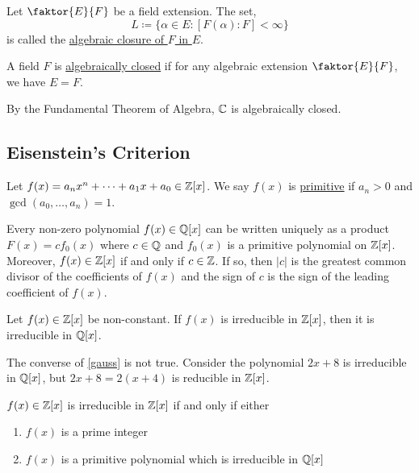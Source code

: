 \documentclass[11pt]{article}
\newcommand{\quotient}[2]{\faktor{#1}{#2}}
\begin{document}
\begin{definition}
Let $\quotient{E}{F}$ be a field extension. The set,
\begin{equation*}
L \coloneqq \{\alpha \in E: [F(\alpha) : F] < \infty\}
\end{equation*}
is called the \underline{algebraic closure of $F$ in $E$}.
\end{definition}
\begin{definition}
A field $F$ is \underline{algebraically closed} if for any algebraic extension
$\quotient{E}{F}$, we have $E = F$.
\end{definition}
\begin{example}
By the Fundamental Theorem of Algebra, $\mathbb{C}$ is algebraically closed.
\end{example}

\subsection{Eisenstein's Criterion}
\begin{definition}
Let $f(x) = a_nx^n + \dots + a_1x + a_0 \in \mathbb{Z}[x]$. We say $f(x)$ is
\underline{primitive} if $a_n > 0$ and $\gcd(a_0, \dots, a_n) = 1$. 
\end{definition}
\begin{lemma*}
Every non-zero polynomial $f(x) \in \mathbb{Q}[x]$ can be written uniquely as a product
$F(x) = cf_0(x)$ where $c \in \mathbb{Q}$ and $f_0(x)$ is a primitive polynomial on
$\mathbb{Z}[x]$. Moreover, $f(x) \in \mathbb{Z}[x]$ if and only if $c \in \mathbb{Z}$. If so, then
$|c|$ is the greatest common divisor of the coefficients of $f(x)$ and the sign
of $c$ is the sign of the leading coefficient of $f(x)$.
\end{lemma*}
\begin{theorem*} \label{gauss}
Let $f(x) \in \mathbb{Z}[x]$ be non-constant. If $f(x)$ is irreducible in $\mathbb{Z}[x]$, then
it is irreducible in $\mathbb{Q}[x]$. 
\end{theorem*}
\begin{example}
The converse of \cref{gauss} is not true. Consider the polynomial $2x + 8$ is
irreducible in $\mathbb{Q}[x]$, but $2x+8 = 2(x+4)$ is reducible in $\mathbb{Z}[x]$.
\end{example}
\begin{remark}
$f(x) \in \mathbb{Z}[x]$  is irreducible in $\mathbb{Z}[x]$ if and only if either
\begin{enumerate}
\item $f(x)$ is a prime integer
\item $f(x)$ is a primitive polynomial which is irreducible in $\mathbb{Q}[x]$
\end{enumerate}
\end{remark}
\end{document}
